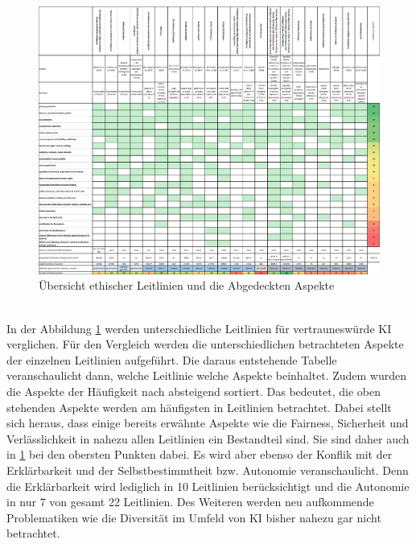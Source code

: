 \begin{onehalfspace}
        \begin{figure}[h]
            \centering
            \includegraphics[width = \textwidth]{Bilder/Ethical huidelines hagendorf 2020.png}
            \caption{Übersicht ethischer Leitlinien und die Abgedeckten Aspekte \cite{Hagendorff2020}}
            \label{fig:EthikGuidelines}
        \end{figure} \\
        In der Abbildung \ref*{fig:EthikGuidelines} werden unterschiedliche Leitlinien für vertrauneswürde \ac*{KI} verglichen. Für den Vergleich werden die unterschiedlichen betrachteten Aspekte der einzelnen Leitlinien aufgeführt. Die daraus entstehende Tabelle veranschaulicht dann, welche Leitlinie welche Aspekte beinhaltet. Zudem wurden die Aspekte der Häufigkeit nach absteigend sortiert. Das bedeutet, die oben stehenden Aspekte werden am häufigsten in Leitlinien betrachtet. Dabei stellt sich heraus, dass einige bereits erwähnte Aspekte wie die Fairness, Sicherheit und Verlässlichkeit in nahezu allen Leitlinien ein Bestandteil sind. Sie sind daher auch in \ref*{fig:EthikGuidelines} bei den obersten Punkten dabei. Es wird aber ebenso der Konflik mit der Erklärbarkeit und der Selbstbestimmtheit bzw. Autonomie veranschaulicht. Denn die Erklärbarkeit wird lediglich in 10 Leitlinien berücksichtigt und die Autonomie in nur 7 von gesamt 22 Leitlinien. Des Weiteren werden neu aufkommende Problematiken wie die Diversität im Umfeld von \ac*{KI} bisher nahezu gar nicht betrachtet.\cite{Hagendorff2020}\cite{jobin2019global} 
        \\

\end{onehalfspace}

